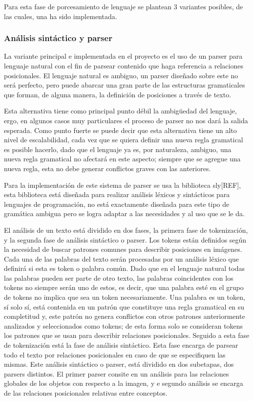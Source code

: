 Para esta fase de porcesamiento de lenguaje se plantean 3 variantes posibles, de las cuales, una ha sido implementada.

\subsubsection*{Análisis sintáctico y parser}
La variante principal e implementada en el proyecto es el uso de un parser para lenguaje natural con el fin de parsear contenido que haga referencia a relaciones posicionales. El lenguaje natural es ambiguo, un parser diseñado sobre este no será perfecto, pero puede abarcar una gran parte de las estructuras gramaticales que forman, de alguna manera, la definición de posiciones a través de texto.

Esta alternativa tiene como principal punto débil la ambigüedad del lenguaje, ergo, en algunos casos muy particulares el proceso de parser no nos dará la salida esperada. Como punto fuerte se puede decir que esta alternativa tiene un alto nivel de escalabilidad, cada vez que se quiera definir una nueva regla gramatical es posible hacerlo, dado que el lenguaje ya es, por naturaleza, ambiguo, una nueva regla gramatical no afectará en este aspecto; siempre que se agregue una nueva regla, esta no debe generar conflictos graves con las anteriores.

Para la implementación de este sistema de parser se usa la biblioteca sly[REF], esta biblioteca está diseñada para realizar análisis léxicos y sintácticos para lenguajes de programación, no está exactamente diseñada para este tipo de gramática ambigua pero se logra adaptar a las necesidades y al uso que se le da.

El análisis de un texto está dividido en dos fases, la primera fase de tokenización, y la segunda fase de análisis sintáctico o parser. Los tokens están definidos según la necesidad de buscar patrones comunes para describir posiciones en imágenes. Cada una de las palabras del texto serán procesadas por un análisis léxico que definirá si esta es token o palabra común. Dado que en el lenguaje natural todas las palabras pueden ser parte de otro texto, las palabras coincidentes con los tokens no siempre serán uno de estos, es decir, que una palabra esté en el grupo de tokens no implica que sea un token necesariamente. Una palabra es un token, s\'i solo s\'i, está contenida en un patrón que constituye una regla gramatical en su completitud y, este patr\'on no genera conflictos con otros patrones anteriormente analizados y seleccionados como tokens; de esta forma solo se consideran tokens los patrones que se usan para describir relaciones posicionales. 
Seguido a esta fase de tokenización est\'a la fase de análisis sintáctico. Esta fase encarga de parsear todo el texto por relaciones posicionales en caso de que se especifiquen las mismas. Este análisis sint\'actico o parser, está dividido en dos subetapas, dos parsers distintos. El primer parser consite en un análisis para las relaciones globales de los objetos con respecto a la imagen, y e segundo análisis se encarga de las relaciones posicionales relativas entre conceptos.

